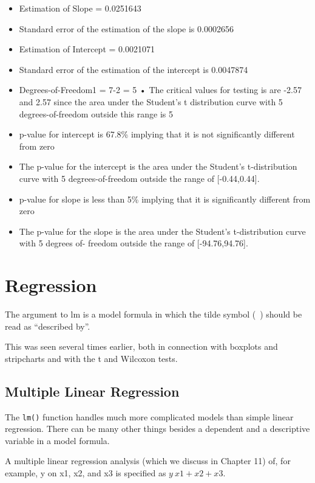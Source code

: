 \begin{itemize}
\item Estimation of Slope = 0.0251643 \item  Standard error of the
estimation of the slope is 0.0002656 \item Estimation of Intercept
= 0.0021071 \item Standard error of the estimation of the
intercept is 0.0047874 \item Degrees-of-Freedom1 = 7-2 = 5 • The
critical values for testing is are -2.57 and 2.57 since the area
under the Student’s t distribution
curve with 5 degrees-of-freedom outside this range is 5%
\item p-value for intercept is 67.8\% implying that it is not
significantly different from zero \item The p-value for the
intercept is the area under the Student’s t-distribution curve
with 5 degrees-of-freedom outside the range of [-0.44,0.44]. \item
p-value for slope is less than 5\% implying that it is
significantly different from zero \item The p-value for the slope
is the area under the Student’s t-distribution curve with 5
degrees of- freedom outside the range of [-94.76,94.76].
\end{itemize}

\section{Regression}

The argument to lm is a model formula in which the tilde symbol
(~) should be read as ``described by”.


This was seen several times earlier, both in connection with
boxplots and stripcharts and with the t and Wilcoxon tests.



\subsection{Multiple Linear Regression}
The \texttt{lm()} function handles much more
complicated models than simple linear regression. There can be many other things besides a dependent and a descriptive variable in a model formula.

A multiple linear regression analysis (which we discuss in Chapter
11) of, for example, y on x1, x2, and x3 is specified as $y ~ x1 +
x2 + x3$.


